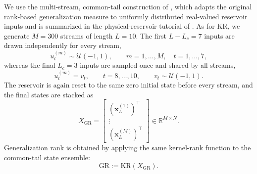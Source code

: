 \documentclass[a4paper,fleqn]{style_neural_networks/cas-dc}
\begin{document}
We use the multi-stream, common-tail construction of \citet{vidamour_quantifying_2022}, which adapts the original rank-based generalization measure to uniformly distributed real-valued reservoir inputs and is summarized in the physical-reservoir tutorial of \citet{Stepney2024PRCtutorial}. As for KR, we generate \(M=300\) streams of length \(L=10\). The first \(L-L_c=7\) inputs are drawn independently for every stream,
\[
u_t^{(m)}\sim\mathcal{U}(-1,1),
\qquad
m=1,\ldots,M,
\quad
t=1,\ldots,7,
\]
whereas the final \(L_c=3\) inputs are sampled once and shared by all streams,
\[
u_t^{(m)}=v_t,
\qquad
t=8,\ldots,10,
\qquad
v_t\sim\mathcal{U}(-1,1).
\]
The reservoir is again reset to the same zero initial state before every stream, and the final states are stacked as
\[
X_{\mathrm{GR}}
=
\begin{bmatrix}
(\mathbf{x}_L^{(1)})^\top\\
\vdots\\
(\mathbf{x}_L^{(M)})^\top
\end{bmatrix}
\in\mathbb{R}^{M\times N}.
\]
Generalization rank is obtained by applying the same kernel-rank function to the common-tail state ensemble:
\[
\mathrm{GR}
:=
\mathrm{KR}\!\left(X_{\mathrm{GR}}\right).
\]
\end{document}
